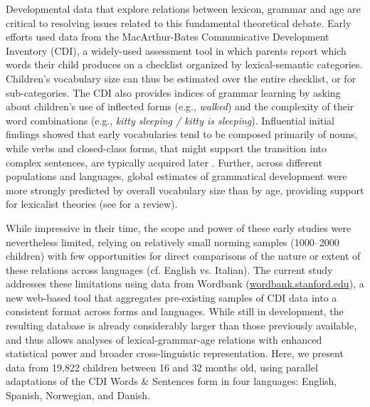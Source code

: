 \documentclass[10pt,letterpaper]{article}
\begin{document}
Developmental data that explore relations between lexicon, grammar and age are critical to resolving issues related to this fundamental theoretical debate. Early efforts used data from the MacArthur-Bates Communicative Development Inventory (CDI), a widely-used assessment tool in which parents report which words their child produces on a checklist organized by lexical-semantic categories. Children's vocabulary size can thus be estimated over the entire checklist, or for sub-categories. The CDI also provides indices of grammar learning by asking about children's use of inflected forms (e.g., \emph{walked}) and the complexity of their word combinations (e.g., \emph{kitty sleeping / kitty is sleeping}). Influential initial findings showed that early vocabularies tend to be composed primarily of nouns, while verbs and closed-class forms, that might support the transition into complex sentences, are typically acquired later \cite{bates1994}. Further, across different populations and languages, global estimates of grammatical development were more strongly predicted by overall vocabulary size than by age, providing support for lexicalist theories (see  for a review).


While impressive in their time, the scope and power of these early studies were nevertheless limited, relying on relatively small norming samples (1000--2000 children) with few opportunities for direct comparisons of the nature or extent of these relations across languages (cf. English vs. Italian). The current study addresses these limitations using data from Wordbank (\url{wordbank.stanford.edu}), a new web-based tool that aggregates pre-existing samples of CDI data into a consistent format across forms and languages. While still in development, the resulting database is already considerably larger than those previously available, and thus allows analyses of lexical-grammar-age relations with enhanced statistical power and broader cross-linguistic representation. Here, we present data from 19,822 children between 16 and 32 months old, using parallel adaptations of the CDI Words \& Sentences form in four languages: English, Spanish, Norwegian, and Danish.

\end{document}
